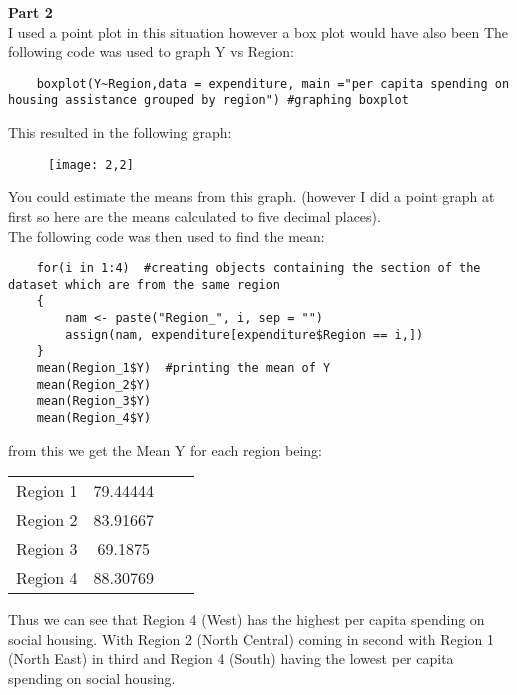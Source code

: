 \documentclass{article}
\begin{document}
\noindent\textbf{\large Part 2\\}
I used a point plot in this situation however a box plot would have also been 
The following code was used to graph Y vs Region:
\begin{verbatim}
	boxplot(Y~Region,data = expenditure, main ="per capita spending on housing assistance grouped by region") #graphing boxplot
\end{verbatim}
This resulted in the following graph:\\

































\begin{figure}[h]
	\centering
	\texttt{[image: 2,2]}
\end{figure}
You could estimate the means from this graph. (however I did a point graph at first so here are the means calculated to five decimal places).\\
The following code was then used to find the mean:
\begin{verbatim}
	for(i in 1:4)  #creating objects containing the section of the dataset which are from the same region
	{ 
		nam <- paste("Region_", i, sep = "")
		assign(nam, expenditure[expenditure$Region == i,])
	}
	mean(Region_1$Y)  #printing the mean of Y
	mean(Region_2$Y)
	mean(Region_3$Y)
	mean(Region_4$Y)
\end{verbatim}
from this we get the Mean Y for each region being:
\begin{center}
	\begin{tabular}{ c c c c }
		Region 1 & 79.44444 \\ 
		Region 2 & 83.91667 \\
		Region 3 & 69.1875    \\
		Region 4 & 88.30769
	\end{tabular}
\end{center}

Thus we can see that Region 4 (West) has the highest per capita spending on social housing. With Region 2 (North Central) coming in second with Region 1 (North East) in third and Region 4 (South) having the lowest per capita spending on social housing. \pagebreak
\end{document}
